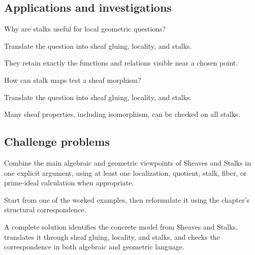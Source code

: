 \subsection*{Applications and investigations}

\begin{exercise}\label{exr:vi13-expand-13}
Why are stalks useful for local geometric questions?
\end{exercise}
\begin{hint}
Translate the question into sheaf gluing, locality, and stalks.
\end{hint}
\begin{solution}
They retain exactly the functions and relations visible near a chosen point.
\end{solution}

\begin{exercise}\label{exr:vi13-expand-14}
How can stalk maps test a sheaf morphism?
\end{exercise}
\begin{hint}
Translate the question into sheaf gluing, locality, and stalks.
\end{hint}
\begin{solution}
Many sheaf properties, including isomorphism, can be checked on all stalks.
\end{solution}

\subsection*{Challenge problems}

\begin{exercise}\label{exr:vi13-expand-15}
Combine the main algebraic and geometric viewpoints of Sheaves and Stalks in one explicit argument, using at least one localization, quotient, stalk, fiber, or prime-ideal calculation when appropriate.
\end{exercise}
\begin{hint}
Start from one of the worked examples, then reformulate it using the chapter's structural correspondence.
\end{hint}
\begin{solution}
A complete solution identifies the concrete model from Sheaves and Stalks, translates it through sheaf gluing, locality, and stalks, and checks the correspondence in both algebraic and geometric language.
\end{solution}

